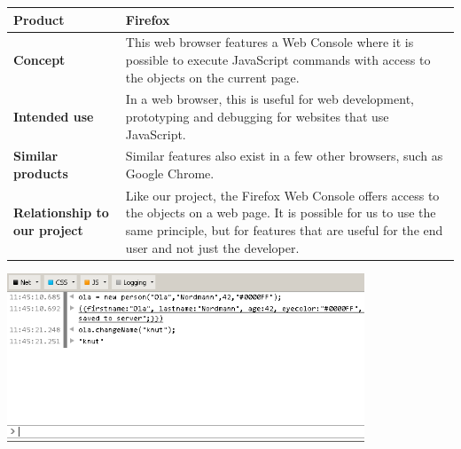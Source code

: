 \begin{center}
\begin{tabularx}{\textwidth}{ l X }
\hline
\textbf{Product} & Firefox \\ \hline
\textbf{Concept} & This web browser features a Web Console where it is possible to execute JavaScript commands with access to the objects on the current page. \\ \hline
\textbf{Intended use} & In a web browser, this is useful for web development, prototyping and debugging for websites that use JavaScript. \\ \hline
\textbf{Similar products} & Similar features also exist in a few other browsers, such as Google Chrome. \\ \hline
\textbf{Relationship to our project} & Like our project, the Firefox Web Console offers access to the objects on a web page. It is possible for us to use the same principle, but for features that are useful for the end user and not just the developer. \\ \hline
\end{tabularx}
\label{tab:firefoxc}
\end{center}

\begin{center}
\includegraphics[width = 0.8\textwidth]{image/firefox.png}
\label{firefoxcimage}%
\end{center}


